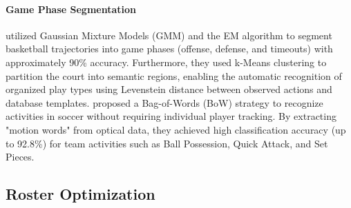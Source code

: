 \paragraph{Game Phase Segmentation}
\cite{Pervse2009trajectory} utilized Gaussian Mixture Models (GMM) and the EM algorithm to segment basketball trajectories into game phases (offense, defense, and timeouts) with approximately 90\% accuracy. 
Furthermore, they used k-Means clustering to partition the court into semantic regions, enabling the automatic recognition of organized play types using Levenstein distance between observed actions and database templates.
\cite{Montoliu2015TeamAR} proposed a Bag-of-Words (BoW) strategy to recognize activities in soccer without requiring individual player tracking. 
By extracting "motion words" from optical data, they achieved high classification accuracy (up to 92.8\%) for team activities such as Ball Possession, Quick Attack, and Set Pieces.

\subsection{Roster Optimization}

